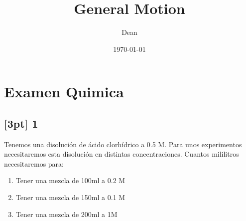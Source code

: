 \documentclass[11pt]{article}
\author{Dean}
\date{\today}
\title{General Motion}
\begin{document}
\maketitle
\section{Examen Quimica}
\label{sec:org0503a09}
\subsection{[3pt] 1}
\label{sec:org875f275}
Tenemos una disolución de ácido clorhídrico a 0.5 M. Para unos experimentos necesitaremos esta disolución en distintas concentraciones. Cuantos mililitros necesitaremos para:
\begin{enumerate}
\item Tener una mezcla de 100ml a 0.2 M
\item Tener una mezcla de 150ml a 0.1 M
\item Tener una mezcla de 200ml a 1M
\end{enumerate}
\end{document}
